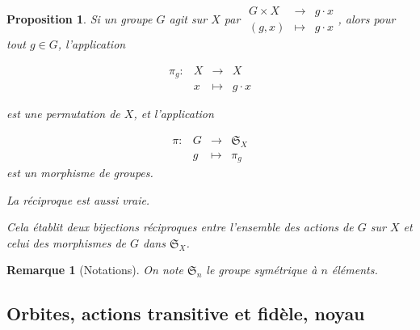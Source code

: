 \documentclass[french]{article}
\newtheorem{prop}{Proposition}[section]
\newtheorem*{remark}{Remarque}
\begin{document}
\begin{prop}
  Si un groupe \(G\) agit sur \(X\) par \(\begin{matrix}
   G \times X & \longrightarrow & g \cdot x \\
   (g,x) & \longmapsto & g \cdot x
  \end{matrix}\), alors pour tout \(g \in G\), l'application

  \[ \begin{matrix}
  \pi_g : & X & \longrightarrow & X \\
  \ & x & \longmapsto & g \cdot x
  \end{matrix}\]

   est une permutation de \(X\), et l'application

   \[\begin{matrix}
   \pi : & G & \longrightarrow & \mathfrak{S}_{X}  \\
   \ & g & \longmapsto & \pi_g
   \end{matrix}\] est un morphisme de groupes.

   La réciproque est aussi vraie.

   Cela établit deux bijections réciproques entre l'ensemble des actions de \(G\) sur \(X\) et celui des morphismes de \(G\) dans \(\mathfrak{S}_{X} \).

\end{prop}

\begin{remark}[Notations]
  On note \(\mathfrak{S}_n\) le groupe symétrique à \(n\) éléments.
\end{remark}

\subsection{Orbites, actions transitive et fidèle, noyau}
\end{document}
